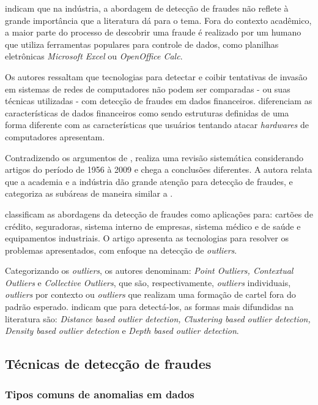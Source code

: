 \documentclass[smallextended]{svjour3}
\begin{document}
\cite{Flegel2010} indicam que na indústria, a abordagem de detecção de fraudes não reflete à grande importância que a literatura dá para o tema. Fora do contexto acadêmico, a maior parte do processo de descobrir uma fraude é realizado por um humano que utiliza ferramentas populares para controle de dados, como planilhas eletrônicas \emph{Microsoft Excel} ou \emph{OpenOffice Calc}. 

Os autores ressaltam que tecnologias para detectar e coibir tentativas de invasão em sistemas de redes de computadores não podem ser comparadas - ou suas técnicas utilizadas - com detecção de fraudes em dados financeiros. \cite{Flegel2010} diferenciam as características de dados financeiros como sendo estruturas definidas de uma forma diferente com as características que usuários tentando atacar \emph{hardwares} de computadores apresentam.

Contradizendo os argumentos de \cite{Flegel2010}, \cite{Pejic-Bach2010} realiza uma revisão sistemática considerando artigos do período de 1956 à 2009 e chega a conclusões diferentes. A autora relata que a academia e a indústria dão grande atenção para detecção de fraudes, e categoriza as subáreas de maneira similar a \cite{Abdallah2016}.

\cite{Bansal2016} classificam as abordagens da detecção de fraudes como aplicações para: cartões de crédito, seguradoras, sistema interno de empresas, sistema médico e de saúde e equipamentos industriais. O artigo apresenta as tecnologias para resolver os problemas apresentados, com enfoque na detecção de \emph{outliers}. 

Categorizando os \emph{outliers}, os autores denominam: \emph{Point Outliers, Contextual Outliers} e \emph{Collective Outliers}, que são, respectivamente, \emph{outliers} individuais, \emph{outliers} por contexto ou \emph{outliers} que realizam uma formação de cartel fora do padrão esperado. \cite{Bansal2016} indicam que para detectá-los, as formas mais difundidas na literatura são: \emph{Distance based outlier detection, Clustering based outlier detection, Density based outlier detection} e \emph{Depth based outlier detection}.

\subsection{Técnicas de detecção de fraudes}
	
\subsubsection{Tipos comuns de anomalias em dados}
\end{document}
